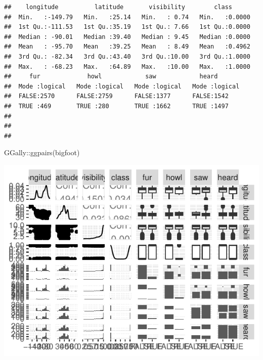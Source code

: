 \documentclass[
]{article}
\newenvironment{Shaded}{\begin{snugshade}}{\end{snugshade}}
\newcommand{\FunctionTok}[1]{\textcolor[rgb]{0.00,0.00,0.00}{#1}}
\newcommand{\NormalTok}[1]{#1}
\newcommand{\SpecialCharTok}[1]{\textcolor[rgb]{0.00,0.00,0.00}{#1}}
\begin{document}
\begin{verbatim}
##    longitude          latitude       visibility        class       
##  Min.   :-149.79   Min.   :25.14   Min.   : 0.74   Min.   :0.0000  
##  1st Qu.:-111.53   1st Qu.:35.19   1st Qu.: 7.66   1st Qu.:0.0000  
##  Median : -90.01   Median :39.40   Median : 9.45   Median :0.0000  
##  Mean   : -95.70   Mean   :39.25   Mean   : 8.49   Mean   :0.4962  
##  3rd Qu.: -82.34   3rd Qu.:43.40   3rd Qu.:10.00   3rd Qu.:1.0000  
##  Max.   : -68.23   Max.   :64.89   Max.   :10.00   Max.   :1.0000  
##     fur             howl            saw            heard        
##  Mode :logical   Mode :logical   Mode :logical   Mode :logical  
##  FALSE:2570      FALSE:2759      FALSE:1377      FALSE:1542     
##  TRUE :469       TRUE :280       TRUE :1662      TRUE :1497     
##                                                                 
##                                                                 
## 
\end{verbatim}

\begin{Shaded}
\begin{Highlighting}[]
\NormalTok{GGally}\SpecialCharTok{::}\FunctionTok{ggpairs}\NormalTok{(bigfoot)}
\end{Highlighting}
\end{Shaded}

\begin{center}\includegraphics{Compulsory-1_files/figure-latex/unnamed-chunk-14-1} \end{center}
\end{document}
